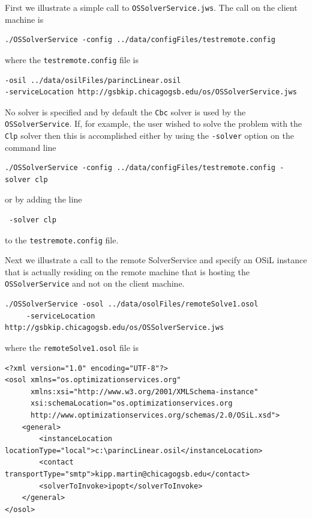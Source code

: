 \documentclass[11pt]{article}
\renewcommand{\_}{{\char"5F}}
\renewcommand{\{}{{\char"7B}}
\renewcommand{\}}{{\char"7D}}
\renewcommand{\^}{{\char"0D}}
\renewcommand{\'}{{\char"0D}}
\begin{document}
\begin{enumerate}[Step 1:]
First we illustrate a simple call to  {\tt OSSolverService.jws}.  The call on the client machine is
\begin{verbatim}
./OSSolverService -config ../data/configFiles/testremote.config
\end{verbatim}
where the {\tt testremote.config} file is
\begin{verbatim}
-osil ../data/osilFiles/parincLinear.osil
-serviceLocation http://gsbkip.chicagogsb.edu/os/OSSolverService.jws
\end{verbatim}

No solver is specified and by default the  {\tt Cbc} solver  is used by the {\tt OSSolverService}.
If, for example, the user wished to solve the problem with the {\tt Clp} solver then this is accomplished
either by using the  {\tt -solver} option on the command line
\begin{verbatim}
./OSSolverService -config ../data/configFiles/testremote.config -solver clp
\end{verbatim}
or by  adding  the line
\begin{verbatim}
 -solver clp
\end{verbatim}
to the  {\tt testremote.config} file.

Next we illustrate a call to the remote SolverService and specify an OSiL instance that is actually residing
on the remote machine that is hosting the {\tt OSSolverService} and not on the client machine.
\begin{verbatim}
./OSSolverService -osol ../data/osolFiles/remoteSolve1.osol
     -serviceLocation  http://gsbkip.chicagogsb.edu/os/OSSolverService.jws
\end{verbatim}
where the {\tt remoteSolve1.osol} file is
\begin{verbatim}
<?xml version="1.0" encoding="UTF-8"?>
<osol xmlns="os.optimizationservices.org"
      xmlns:xsi="http://www.w3.org/2001/XMLSchema-instance"
      xsi:schemaLocation="os.optimizationservices.org
      http://www.optimizationservices.org/schemas/2.0/OSiL.xsd">
    <general>
        <instanceLocation locationType="local">c:\parincLinear.osil</instanceLocation>
        <contact transportType="smtp">kipp.martin@chicagogsb.edu</contact>
        <solverToInvoke>ipopt</solverToInvoke>      
    </general>
</osol>
\end{verbatim}


\end{enumerate}
\end{document}
